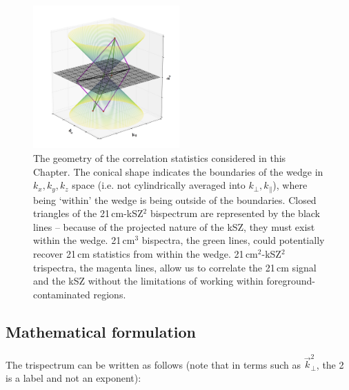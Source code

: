 \begin{figure}
\centering
\includegraphics[width=0.5\textwidth]{chapters/ksz_21cm/figures/trispec_and_bispec_3d_fig.png}
\caption[The geometry of the correlation statistics considered in this Chapter.]{The geometry of the correlation statistics considered in this Chapter. The conical shape indicates the boundaries of the wedge in $k_x,k_y,k_z$ space (i.e. not cylindrically averaged into $k_{\perp},k_{\parallel}$), where being `within' the wedge is being outside of the boundaries. Closed triangles of the 21\,cm-kSZ$^2$ bispectrum are represented by the black lines -- because of the projected nature of the kSZ, they must exist within the wedge. 21\,cm$^3$ bispectra, the green lines, could potentially recover 21\,cm statistics from within the wedge. 21\,cm$^2$-kSZ$^2$ trispectra, the magenta lines, allow us to correlate the 21\,cm signal and the kSZ without the limitations of working within foreground-contaminated regions.}
\label{fig:ksz_21cm_correlation_geometries}
\end{figure}

\subsection{Mathematical formulation}

The trispectrum can be written as follows (note that in terms such as $\vec{k}^2_{\perp}$, the 2 is a label and not an exponent):

